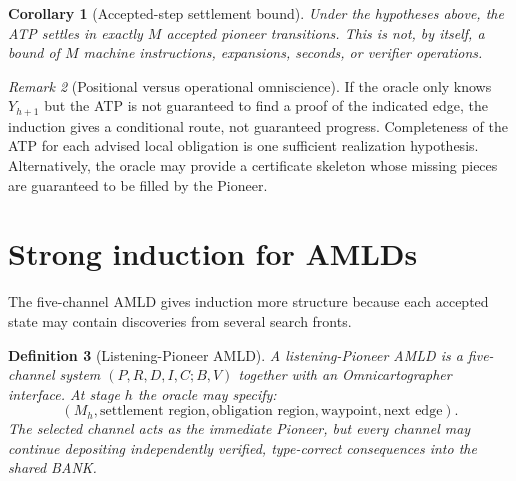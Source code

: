 \documentclass[11pt]{article}
\newtheorem{definition}{Definition}[section]
\newtheorem{corollary}[definition]{Corollary}
\theoremstyle{remark}
\newtheorem{remark}[definition]{Remark}
\begin{document}
\begin{corollary}[Accepted-step settlement bound]
Under the hypotheses above, the ATP settles in exactly $M$ accepted pioneer transitions. This is not, by itself, a bound of $M$ machine instructions, expansions, seconds, or verifier operations.
\end{corollary}

\begin{remark}[Positional versus operational omniscience]
If the oracle only knows $Y_{h+1}$ but the ATP is not guaranteed to find a proof of the indicated edge, the induction gives a conditional route, not guaranteed progress. Completeness of the ATP for each advised local obligation is one sufficient realization hypothesis. Alternatively, the oracle may provide a certificate skeleton whose missing pieces are guaranteed to be filled by the Pioneer.
\end{remark}

\section{Strong induction for AMLDs}

The five-channel AMLD gives induction more structure because each accepted state may contain discoveries from several search fronts.

\begin{definition}[Listening-Pioneer AMLD]
A listening-Pioneer AMLD is a five-channel system $(P,R,D,I,C;B,V)$ together with an Omnicartographer interface. At stage $h$ the oracle may specify:
\[
(M_h,\text{settlement region},\text{obligation region},\text{waypoint},\text{next edge}).
\]
The selected channel acts as the immediate Pioneer, but every channel may continue depositing independently verified, type-correct consequences into the shared BANK.
\end{definition}
\end{document}
